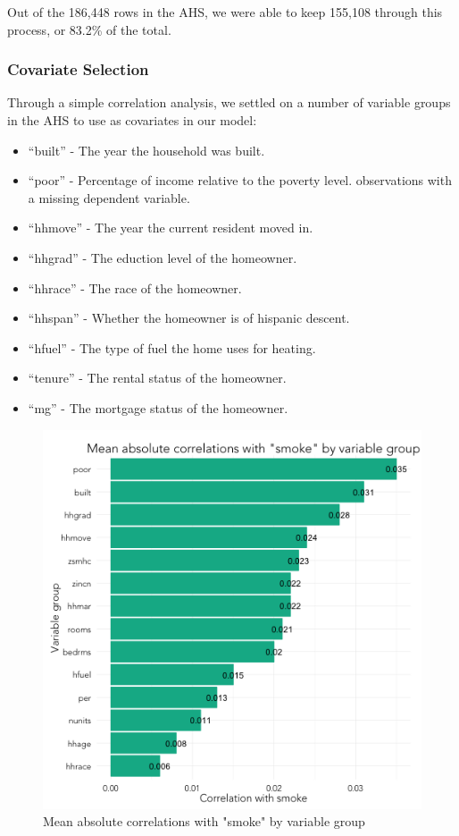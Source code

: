 \documentclass{sig-alternate}
\begin{document}
Out of the 186,448 rows in the AHS, we were able to keep 155,108 through this process, or 83.2\% of the total. 

\subsubsection{Covariate Selection}

Through a simple correlation analysis, we settled on a number of variable groups in the AHS to use as covariates in our model:

\begin{itemize} 
\item ``built'' - The year the household was built. 
\item ``poor'' - Percentage of income relative to the poverty level. observations with a missing dependent variable.
\item ``hhmove'' - The year the current resident moved in.
\item ``hhgrad'' - The eduction level of the homeowner.
\item ``hhrace'' - The race of the homeowner.
\item ``hhspan'' - Whether the homeowner is of hispanic descent.
\item ``hfuel'' - The type of fuel the home uses for heating. 
\item ``tenure'' - The rental status of the homeowner.
\item ``mg'' - The mortgage status of the homeowner.
\end{itemize}

\begin{figure}
\centering 
\includegraphics[scale=0.42]{explore-correlations-1-2.png}
\caption{Mean absolute correlations with "smoke" by variable group}
\end{figure}
\end{document}
